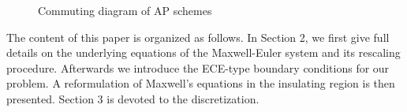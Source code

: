\documentclass{article}
\newcommand{\todo}[1]{\textcolor{blue}{\fbox{\textbf{TODO: #1}}}}
\begin{document}
\begin{figure}
    \centering
    \caption{Commuting diagram of AP schemes}
    \label{fig:commutative_diagram_ap}
\end{figure}

The content of this paper is organized as follows. In Section 2, we first give full details on the underlying equations of the Maxwell-Euler system and its rescaling procedure. Afterwards we introduce the ECE-type boundary conditions for our problem. A reformulation of Maxwell's equations in the insulating region is then presented. Section 3 is devoted to the discretization. \todo{outline}  
\end{document}
